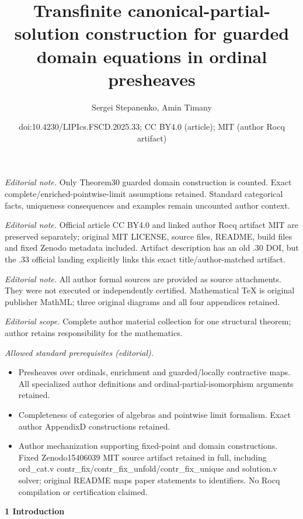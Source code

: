 \documentclass[10pt,a4paper]{article}
\title{Transfinite canonical-partial-solution construction for guarded domain equations in ordinal presheaves}
\author{Sergei Stepanenko, Amin Timany}
\date{doi:10.4230/LIPIcs.FSCD.2025.33; CC BY4.0 (article); MIT (author Rocq artifact)}
\begin{document}
\maketitle
\noindent\textit{Editorial note.} Only Theorem30 guarded domain construction is counted. Exact complete/enriched-pointwise-limit assumptions retained. Standard categorical facts, uniqueness consequences and examples remain uncounted author context.\par\medskip
\noindent\textit{Editorial note.} Official article CC BY4.0 and linked author Rocq artifact MIT are preserved separately; original MIT LICENSE, source files, README, build files and fixed Zenodo metadata included. Artifact description has an old .30 DOI, but the .33 official landing explicitly links this exact title/author-matched artifact.\par\medskip
\noindent\textit{Editorial note.} All author formal sources are provided as source attachments. They were not executed or independently certified. Mathematical TeX is original publisher MathML; three original diagrams and all four appendices retained.\par\medskip
\noindent\textit{Editorial scope.} Complete author material collection for one structural theorem; author retains responsibility for the mathematics.\par\medskip
\noindent\textit{Allowed standard prerequisites (editorial).}\begin{itemize}
\item Presheaves over ordinals, enrichment and guarded/locally contractive maps. All specialized author definitions and ordinal-partial-isomorphism arguments retained.
\item Completeness of categories of algebras and pointwise limit formalism. Exact author AppendixD constructions retained.
\item Author mechanization supporting fixed-point and domain constructions. Fixed Zenodo15406039 MIT source artifact retained in full, including ord\_cat.v contr\_fix/contr\_fix\_unfold/contr\_fix\_unique and solution.v solver; original README maps paper statements to identifiers. No Rocq compilation or certification claimed.
\end{itemize}\medskip

 
\par\medskip\noindent\textbf{1 Introduction}\par
 
 
\end{document}
